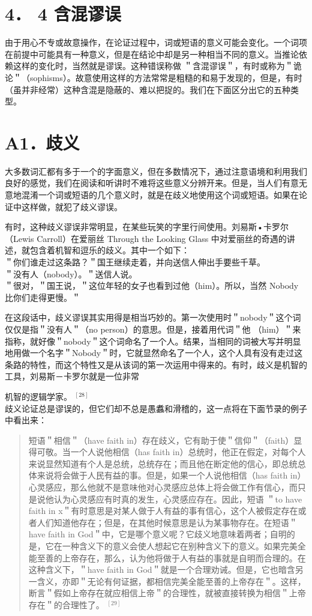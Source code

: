 \section*{4． 4 含混谬误}
由于用心不专或故意操作，在论证过程中，词或短语的意义可能会变化。一个词项在前提中可能具有一种意义，但是在结论中却是另一种相当不同的意义。当推论依赖这样的变化时，当然就是谬误。这种错误称做 ＂含混谬误＂，有时或称为＂诡论＂（sophisms）。故意使用这样的方法常常是粗糙的和易于发现的，但是，有时（虽并非经常）这种含混是隐蔽的、难以把捉的。我们在下面区分出它的五种类型。

\section*{A1．歧义}
大多数词汇都有多于一个的字面意义，但在多数情况下，通过注意语境和利用我们良好的感觉，我们在阅读和听讲时不难将这些意义分辨开来。但是，当人们有意无意地混淆一个词或短语的几个意义时，就是在歧义地使用这个词或短语。如果在论证中这样做，就犯了歧义谬误。

有时，这种歧义谬误非常明显，在某些玩笑的字里行间使用。刘易斯•卡罗尔（Lewis Carroll）在爱丽丝 Through the Looking Glass 中对爱丽丝的奇遇的讲述，就包含着机智和逗乐的歧义。其中一个如下：\\
＂你们谁走过这条路？＂国王继续走着，并向送信人伸出手要些千草。\\
＂没有人（nobody）。＂送信人说。\\
＂很对，＂国王说，＂这位年轻的女子也看到过他（him）。所以，当然 Nobody 比你们走得更慢。＂

在这段话中，歧义谬误其实用得是相当巧妙的。第一次使用时＂nobody＂这个词仅仅是指＂没有人＂（no person）的意思。但是，接着用代词＂他 （him）＂来指称，就好像＂nobody＂这个词命名了一个人。结果，当相同的词被大写并明显地用做一个名字＂Nobody＂时，它就显然命名了一个人，这个人具有没有走过这条路的特性，而这个特性又是从该词的第一次运用中得来的。有时，歧义是机智的工具，刘易斯－卡罗尔就是一位非常

机智的逻辑学家。 ${ }^{[28]}$\\
歧义论证总是谬误的，但它们却不总是愚䘄和滑稽的，这一点将在下面节录的例子中看出来：

\begin{abstract}
短语＂相信＂（have faith in）存在歧义，它有助于使＂信仰＂（faith）显得可敬。当一个人说他相信（has faith in）总统时，他正在假定，对每个人来说显然知道有个人是总统，总统存在；而且他在断定他的信心，即总统总体来说将会做于人民有益的事。但是，如果一个人说他相信（has faith in）心灵感应，那么他就不是意味他对心灵感应总体上将会做工作有信心，而只是说他认为心灵感应有时真的发生，心灵感应存在。因此，短语 ＂to have faith in x＂有时意思是对某人做于人有益的事有信心，这个人被假定存在或者人们知道他存在；但是，在其他时候意思是认为某事物存在。在短语＂have faith in God＂中，它是哪个意义呢？它歧义地意味着两者；自明的是，它在一种含义下的意义会使人想起它在别种含义下的意义。如果完美全能至善的上帝存在，那么，认为他将做于人有益的事就是自明而合理的。在这种含义下，＂have faith in God＂就是一个合理劝诫。但是，它也暗含另一含义，亦即＂无论有何证据，都相信完美全能至善的上帝存在＂。这样，断言＂假如上帝存在就应相信上帝＂的合理性，就被直接转换为相信＂上帝存在＂的合理性了。 ${ }^{[29]}$
\end{abstract}

